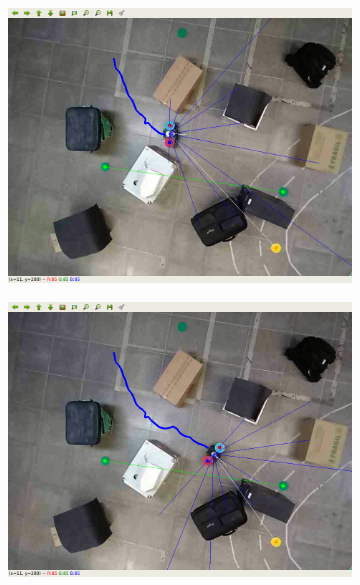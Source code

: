 \begin{figure}[htbp]
\begin{subfigure}[b]{0.115\textwidth}
        \includegraphics[width=\textwidth]{images/test_env2/3.png}
    \end{subfigure}
    \hfill
    \begin{subfigure}[b]{0.115\textwidth}
        \includegraphics[width=\textwidth]{images/test_env2/4.png}
    \end{subfigure}
    \newline
    \begin{subfigure}[b]{0.115\textwidth}

\end{subfigure}
\end{figure}
